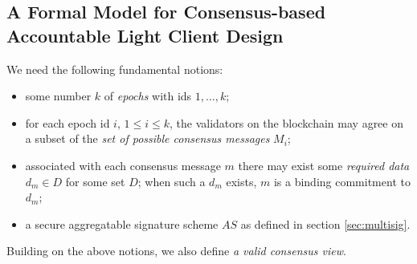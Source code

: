 \begin{comment}
\noindent Depending on the adversarial model, we have two cases as well. The first security model assumes that at least $t'$ validators 
in each validator set are honest, hence there cannot be a collusion between the possibly malicious prover and the honest validators reaching 
consensus on the blockchain. In turn, this implies that \textit{soundness} suffices as a security property, i.e., the prover should not be able to 
wrongly convince the verifier that consensus has been reached on any event or message outside of some small probability. The second security 
model strengthens the adversarial capability by not making any assumption regarding the fraction of honest validators in at least one of the validator 
sets. Hence a stronger security property is needed. We call it \textit{accountability}. This captures the intuition that if the light client is convinced of 
something that the blockchain did not achieve consensus on, and if the light client and prover's communication transcript is made public, then using 
it and other public information, it should be possible to identify an epoch and a number of dishonest validators equal to at least the total number of validators in 
that epoch minus $t'$.
\end{comment}

\subsection{A Formal Model for Consensus-based Accountable Light Client Design}
\label{sec:LCformal_model}

\noindent We need the following fundamental notions:

\begin{itemize}
\item some number $k$ of \textit{epochs} with ids $1,\dots, k$;
\item for each epoch id $i$, $1 \leq i \leq k$, the validators on the blockchain may agree on a subset of the \textit{set of possible consensus messages} $M_i$;
\item associated with each consensus message $m$ there may exist some \textit{required data} $d_{m} \in D$ for some set $D$; 
when such a $d_m$ exists, $m$ is a binding commitment to $d_m$; 
\item a secure aggregatable signature scheme $\mathit{AS}$ as defined in section \ref{sec:multisig}.
\end{itemize}

\noindent Building on the above notions, we also define \textit{a valid consensus view}. 

